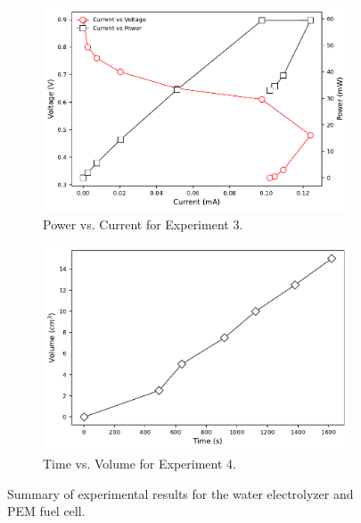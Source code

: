 \begin{figure}[H]
    \begin{subfigure}[t]{0.45\textwidth}
        \centering
        \includegraphics[width=\textwidth]{Output/Exp3_power.pdf}
        \caption{Power vs. Current for Experiment 3.}
        \label{fig:summary_results:exp3}
    \end{subfigure}
    \hfill
    \begin{subfigure}[t]{0.45\textwidth}
        \centering
        \includegraphics[width=\textwidth]{Output/Exp4.pdf}
        \caption{Time vs. Volume for Experiment 4.}
        \label{fig:summary_results:exp4}
    \end{subfigure}

    \caption{Summary of experimental results for the water electrolyzer and PEM fuel cell.}
    \label{fig:summary_results}
\end{figure}
